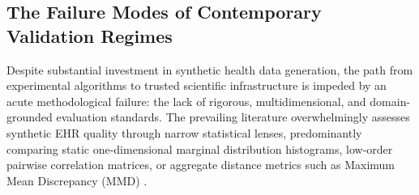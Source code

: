 \documentclass[journal]{IEEEtran}
\begin{document}
\subsection{The Failure Modes of Contemporary Validation Regimes}
Despite substantial investment in synthetic health data generation, the path from experimental algorithms to trusted scientific infrastructure is impeded by an acute methodological failure: the lack of rigorous, multidimensional, and domain-grounded evaluation standards. The prevailing literature overwhelmingly assesses synthetic EHR quality through narrow statistical lenses, predominantly comparing static one-dimensional marginal distribution histograms, low-order pairwise correlation matrices, or aggregate distance metrics such as Maximum Mean Discrepancy (MMD) \cite{hernandez2022synthetic, alaa2022generative}.
\end{document}
